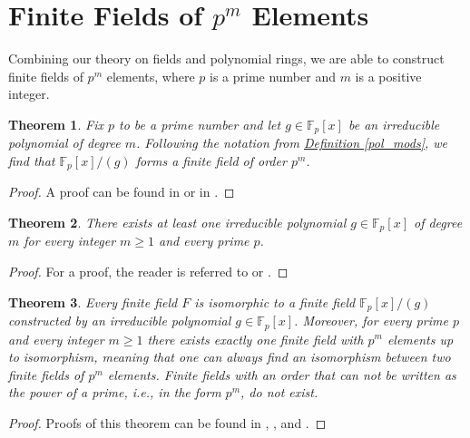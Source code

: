 \documentclass[openany, a4paper, 10pt]{book}
\theoremstyle{plain}
\newtheorem{theorem}{Theorem}[chapter]
\theoremstyle{plain}
\theoremstyle{plain}
\theoremstyle{definition}
\theoremstyle{plain}
\theoremstyle{definition}
\theoremstyle{remark}
\newcommand{\defref}[1]{\hyperref[#1]{Definition \ref{#1}}}
\begin{document}
\section{Finite Fields of \texorpdfstring{$p^m$}{pm} Elements}
Combining our theory on fields and polynomial rings, we are able to construct finite fields of $p^m$ elements, where $p$ is a prime number and $m$ is a positive integer.
\begin{theorem}\label{ff_from_polrings}
    Fix $p$ to be a prime number and let $g \in \mathbb F_p[x]$ be an irreducible polynomial of degree $m$.
    Following the notation from \defref{pol_mods}, we find that $\mathbb F_p[x]/(g)$ forms a finite field of order $p^m$.
\end{theorem}
\begin{proof}
    A proof can be found in \cite[Theorem~7.9]{Forney_finite_fields} or in
    \cite[Theorems~1.3.13,1.3.15]{dictaat_joost}.
\end{proof}
\begin{theorem}
    There exists at least one irreducible polynomial
    $g \in \mathbb F_p[x]$ of degree $m$
    for every integer $m \geq 1$ and every prime $p$.
\end{theorem}
\begin{proof}
    For a proof, the reader is referred to \cite[Theorem~2.6.6]{dictaat_joost} or \cite[Lemma~1.4]{huo_ff}.
\end{proof}
\begin{theorem}\label{theo:ff}
    Every finite field $F$ is isomorphic to a finite field $\mathbb F_p[x]/(g)$ constructed by an irreducible polynomial $g \in \mathbb F_p[x]$.
    Moreover, for every prime $p$ and every integer $m \geq 1$ there exists exactly one finite field with $p^m$ elements up to isomorphism, meaning that one can always find an isomorphism between two finite fields of $p^m$ elements. Finite fields with an order that can not be written as the power of a prime, i.e., in the form $p^m$, do not exist.
\end{theorem}
\begin{proof}
    Proofs of this theorem can be found in
    \cite[Section~1.1~up~to~Theorem~1.2]{huo_ff}, \cite[Theorems~7.16,7.18]{Forney_finite_fields}, and
    \cite[Theorems~2.6.2,2.8.9]{dictaat_joost}.
\end{proof}
\end{document}
